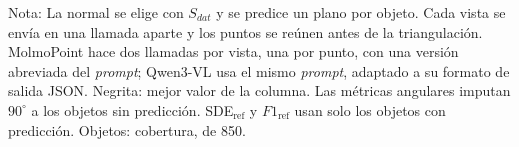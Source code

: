 \begin{table}[htbp]
\vspace{1.5ex}
\begin{minipage}{\wd\tablebox}
\footnotesize
Nota: La normal se elige con $S_{dat}$ y se predice un plano por objeto. Cada vista se envía en una llamada aparte y los puntos se reúnen antes de la triangulación. MolmoPoint hace dos llamadas por vista, una por punto, con una versión abreviada del \textit{prompt}; Qwen3-VL usa el mismo \textit{prompt}, adaptado a su formato de salida JSON. Negrita: mejor valor de la columna. Las métricas angulares imputan $90^\circ$ a los objetos sin predicción. SDE$_{\mathrm{ref}}$ y $F1_{\mathrm{ref}}$ usan solo los objetos con predicción. Objetos: cobertura, de 850.
\end{minipage}
\end{table}
